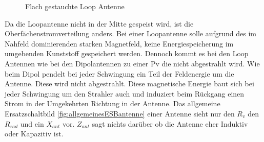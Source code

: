 \begin{figure}[h]
	\begin{center}
	\end{center}
\caption{Flach gestauchte Loop Antenne}
\label{fig:FflacheLoopAntenne}
\end{figure}

Da  die Loopantenne nicht in der Mitte gespeist wird, ist die Oberfächenstromverteilung anders. Bei einer Loopantenne solle aufgrund des im Nahfeld dominierenden starken Magnetfeld, keine Energiespeicherung im umgebenden Kunststoff gespeichert werden. Dennoch kommt es bei den Loop Antennen wie bei den Dipolantennen zu einer Pv die nicht abgestrahlt wird. Wie beim Dipol pendelt bei jeder Schwingung ein Teil der Feldenergie um die Antenne. Diese wird nicht abgestrahlt. Diese magnetische Energie baut sich bei jeder Schwingung um den Strahler auch und induziert beim Rückgang einen Strom in der Umgekehrten Richtung in der Antenne. Das allgemeine Ersatzschaltbild \ref{fig:allgemeinesESBantenne} einer Antenne sieht nur den $R_{v}$ den $R_{rad}$ und ein $X_{ant}$ vor. $Z_{ant}$ sagt nichts darüber ob die Antenne eher Induktiv oder Kapazitiv ist.

